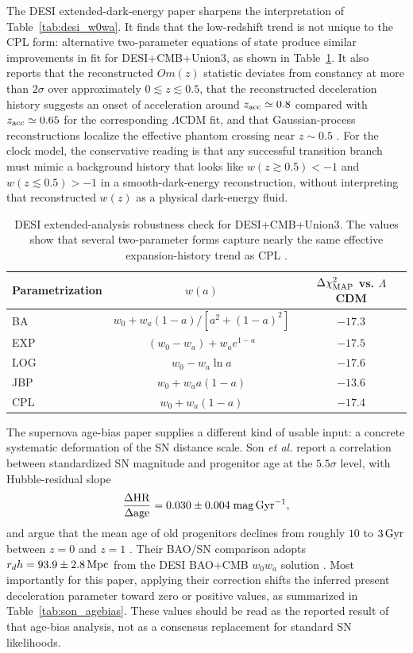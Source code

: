 \documentclass[aps,prd,reprint,nofootinbib,superscriptaddress,longbibliography]{revtex4-2}
\newcommand{\LCDM}{$\Lambda$CDM}
\begin{document}
The DESI extended-dark-energy paper sharpens the interpretation of Table~\ref{tab:desi_w0wa}.  It finds that the low-redshift trend is not unique to the CPL form: alternative two-parameter equations of state produce similar improvements in fit for DESI+CMB+Union3, as shown in Table~\ref{tab:desi_extended_param}.  It also reports that the reconstructed $Om(z)$ statistic deviates from constancy at more than $2\sigma$ over approximately $0\lesssim z\lesssim0.5$, that the reconstructed deceleration history suggests an onset of acceleration around $z_{\rm acc}\simeq0.8$ compared with $z_{\rm acc}\simeq0.65$ for the corresponding \LCDM{} fit, and that Gaussian-process reconstructions localize the effective phantom crossing near $z\sim0.5$ \cite{DESIExtended}.  For the clock model, the conservative reading is that any successful transition branch must mimic a background history that looks like $w(z\gtrsim0.5)<-1$ and $w(z\lesssim0.5)>-1$ in a smooth-dark-energy reconstruction, without interpreting that reconstructed $w(z)$ as a physical dark-energy fluid.

\begin{table}[t]
\footnotesize
\caption{DESI extended-analysis robustness check for DESI+CMB+Union3.  The values show that several two-parameter forms capture nearly the same effective expansion-history trend as CPL \cite{DESIExtended}.}
\begin{ruledtabular}
\begin{tabular}{lcc}
Parametrization & $w(a)$ & $\Delta\chi^2_{\rm MAP}$ vs. \LCDM{} \\
\hline
BA & $w_0+w_a(1-a)/[a^2+(1-a)^2]$ & $-17.3$ \\
EXP & $(w_0-w_a)+w_a e^{1-a}$ & $-17.5$ \\
LOG & $w_0-w_a\ln a$ & $-17.6$ \\
JBP & $w_0+w_a a(1-a)$ & $-13.6$ \\
CPL & $w_0+w_a(1-a)$ & $-17.4$ \\
\end{tabular}
\end{ruledtabular}
\label{tab:desi_extended_param}
\end{table}

The supernova age-bias paper supplies a different kind of usable input: a concrete systematic deformation of the SN distance scale.  Son \emph{et al.} report a correlation between standardized SN magnitude and progenitor age at the $5.5\sigma$ level, with Hubble-residual slope
\begin{equation}
\frac{\Delta {\rm HR}}{\Delta {\rm age}}=0.030\pm0.004\;{\rm mag\,Gyr^{-1}},
\label{eq:son_age_slope}
\end{equation}
and argue that the mean age of old progenitors declines from roughly $10$ to $3\,{\rm Gyr}$ between $z=0$ and $z=1$ \cite{Son2025}.  Their BAO/SN comparison adopts $r_d h=93.9\pm2.8\,{\rm Mpc}$ from the DESI BAO+CMB $w_0w_a$ solution \cite{Son2025}.  Most importantly for this paper, applying their correction shifts the inferred present deceleration parameter toward zero or positive values, as summarized in Table~\ref{tab:son_agebias}.  These values should be read as the reported result of that age-bias analysis, not as a consensus replacement for standard SN likelihoods.
\end{document}
